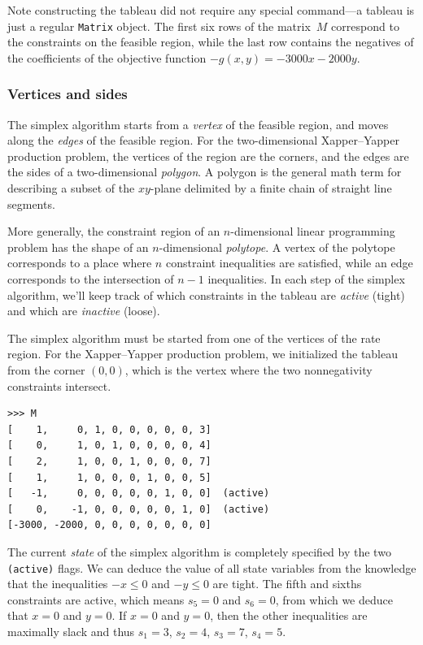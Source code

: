 \documentclass[11pt,oneside]{article}
\begin{document}
	\noindent
	Note  constructing the tableau did not require any special command---a tableau is just a regular \texttt{Matrix} object.
	The first six rows of the matrix~$M$ correspond to the constraints on the feasible region,
	while the last row contains the negatives of the coefficients of the objective function $-g(x,y)=-3000x-2000y$.
	

	\subsubsection{Vertices and sides}
	
		The simplex algorithm starts from a \emph{vertex} of the feasible region,
		and moves along the \emph{edges} of the feasible region.
		For the two-dimensional Xapper--Yapper production problem,
		the vertices of the region are the corners,
		and the edges are the sides of a two-dimensional \emph{polygon}.
		A polygon is the general math term for describing a subset of the $xy$-plane
		delimited by a finite chain of straight line segments.
		
		More generally,
		the constraint region of an $n$-dimensional linear programming problem has the shape of an $n$-dimensional \emph{polytope}.
		A vertex of the polytope corresponds to a place where $n$ constraint inequalities are satisfied,
		while an edge corresponds to the intersection of $n-1$ inequalities.		
		In each step of the simplex algorithm,
		we'll keep track of which constraints in the tableau are \emph{active} (tight) and which are \emph{inactive} (loose).
		
		The simplex algorithm must be started from one of the vertices of the rate region.
		For the Xapper--Yapper production problem,
		we initialized the tableau from the corner $(0,0)$,
		which is the vertex where the two nonnegativity constraints intersect.
				
\begin{verbatim}
>>> M
[    1,     0, 1, 0, 0, 0, 0, 0, 3]
[    0,     1, 0, 1, 0, 0, 0, 0, 4]
[    2,     1, 0, 0, 1, 0, 0, 0, 7]
[    1,     1, 0, 0, 0, 1, 0, 0, 5]
[   -1,     0, 0, 0, 0, 0, 1, 0, 0]  (active)
[    0,    -1, 0, 0, 0, 0, 0, 1, 0]  (active)
[-3000, -2000, 0, 0, 0, 0, 0, 0, 0]
\end{verbatim}

		\noindent
		The current \emph{state} of the simplex algorithm is completely specified by the two \texttt{(active)} flags.
		We can deduce the value of all state variables from the knowledge that the inequalities
		$-x \leq  0$ and $-y \leq  0$ are tight.
		The fifth and sixths constraints are active,
		which means $s_5=0$ and $s_6=0$,
		from which we deduce that $x=0$ and $y=0$.
		If $x=0$ and $y=0$,
		then the other inequalities are maximally slack and thus $s_1=3$, $s_2=4$, $s_3=7$, $s_4=5$.
		
\end{document}

